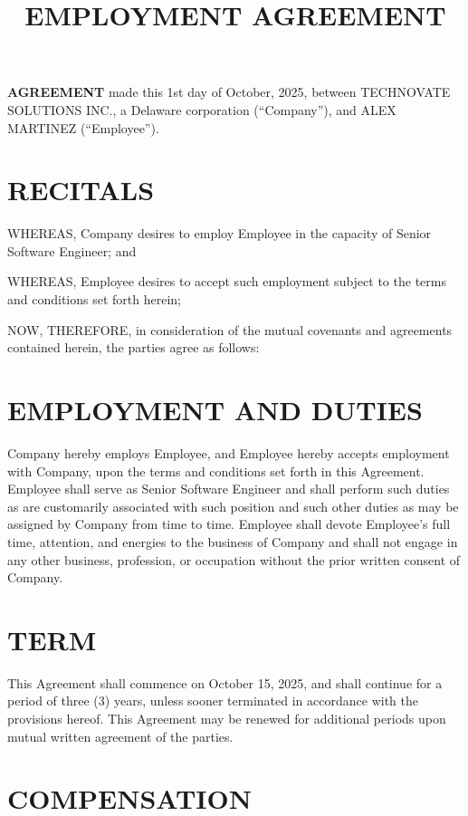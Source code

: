 \documentclass[12pt,letterpaper]{article}
\title{\textbf{EMPLOYMENT AGREEMENT}}
\author{}
\date{}
\begin{document}
\maketitle

\noindent \textbf{AGREEMENT} made this 1st day of October, 2025, between TECHNOVATE SOLUTIONS INC., a Delaware corporation (``Company''), and ALEX MARTINEZ (``Employee'').

\section*{RECITALS}

\noindent WHEREAS, Company desires to employ Employee in the capacity of Senior Software Engineer; and

\noindent WHEREAS, Employee desires to accept such employment subject to the terms and conditions set forth herein;

\noindent NOW, THEREFORE, in consideration of the mutual covenants and agreements contained herein, the parties agree as follows:

\section{EMPLOYMENT AND DUTIES}

Company hereby employs Employee, and Employee hereby accepts employment with Company, upon the terms and conditions set forth in this Agreement. Employee shall serve as Senior Software Engineer and shall perform such duties as are customarily associated with such position and such other duties as may be assigned by Company from time to time. Employee shall devote Employee's full time, attention, and energies to the business of Company and shall not engage in any other business, profession, or occupation without the prior written consent of Company.

\section{TERM}

This Agreement shall commence on October 15, 2025, and shall continue for a period of three (3) years, unless sooner terminated in accordance with the provisions hereof. This Agreement may be renewed for additional periods upon mutual written agreement of the parties.

\section{COMPENSATION}
\end{document}
